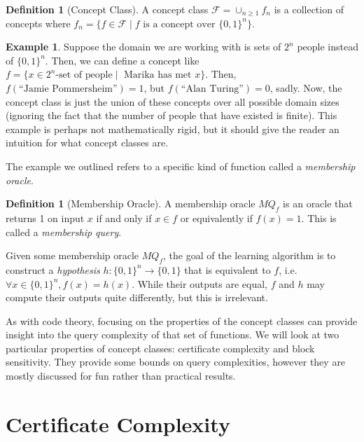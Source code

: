 \documentclass[12pt,twoside]{reedthesis}
\theoremstyle{definition}
\newtheorem{definition}[theorem]{Definition}
\newtheorem{example}[theorem]{Example}
\begin{document}
\begin{definition}[Concept Class] A concept class $\mathcal{F} = \cup_{n \geq 1} f_n$ is a collection of concepts where $f_n = \{f \in \mathcal{F} \mid f \text{ is a concept over } \{0,1\}^n\}$.
\end{definition}

\begin{example}
Suppose the domain we are working with is sets of $2^n$ people instead of $\{0,1\}^n$. Then, we can define a concept like $f = \{ x\in 2^n \text{-set of people} \mid \text{ Marika has met } x\}$. Then, $f(\text{``Jamie Pommersheim''}) = 1$, but $f(\text{``Alan Turing''}) = 0$, sadly. Now, the concept class is just the union of these concepts over all possible domain sizes (ignoring the fact that the number of people that have existed is finite). This example is perhaps not mathematically rigid, but it should give the reader an intuition for what concept classes are.
\end{example}

The example we outlined refers to a specific kind of function called a \textit{membership oracle}.
\begin{definition}[Membership Oracle] A membership oracle $MQ_f$ is an oracle that returns 1 on input $x$ if and only if $x \in f$ or equivalently if $f(x)=1$. This is called a \textit{membership query}.
\end{definition}

Given some membership oracle $MQ_f$, the goal of the learning algorithm is to construct a \textit{hypothesis} $h: \{0,1\}^n \rightarrow \{0,1\}$ that is equivalent to $f$, i.e.~$\forall x \in \{0,1\}^n, f(x) = h(x)$. While their outputs are equal, $f$ and $h$ may compute their outputs quite differently, but this is irrelevant.

As with code theory, focusing on the properties of the concept classes can provide insight into the query complexity of that set of functions. We will look at two particular properties of concept classes: certificate complexity and block sensitivity. They provide some bounds on query complexities, however they are mostly discussed for fun rather than practical results.
\section{Certificate Complexity}
\end{document}

